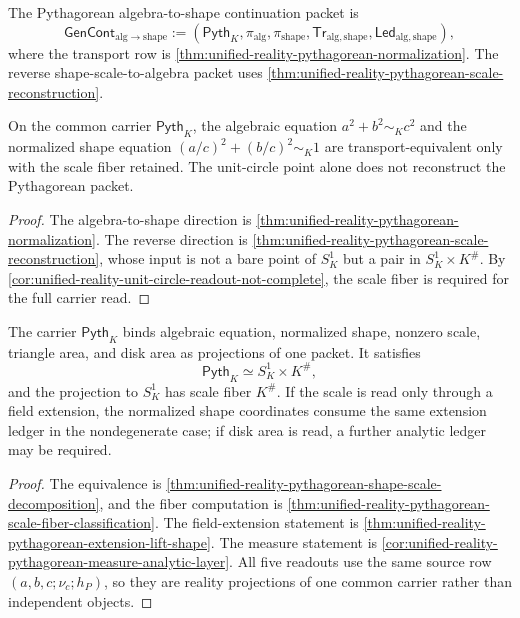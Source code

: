 \begin{definition}
\label{def:unified-reality-pythagorean-generalized-continuation}
The Pythagorean algebra-to-shape continuation packet is
$$
\mathsf{GenCont}_{\mathrm{alg}\to\mathrm{shape}}
:=
(\mathsf{Pyth}_K,\pi_{\mathrm{alg}},\pi_{\mathrm{shape}},
\mathsf{Tr}_{\mathrm{alg},\mathrm{shape}},
\mathsf{Led}_{\mathrm{alg},\mathrm{shape}}),
$$
where the transport row is
\autoref{thm:unified-reality-pythagorean-normalization}. The reverse
shape-scale-to-algebra packet uses
\autoref{thm:unified-reality-pythagorean-scale-reconstruction}.
\end{definition}

\begin{theorem}
\label{thm:unified-reality-pythagorean-algebra-geometry-transport}
On the common carrier $\mathsf{Pyth}_K$, the algebraic equation
$a^2+b^2\sim_Kc^2$ and the normalized shape equation
$(a/c)^2+(b/c)^2\sim_K1$ are transport-equivalent only with the scale
fiber retained. The unit-circle point alone does not reconstruct the
Pythagorean packet.
\end{theorem}

\begin{proof}
The algebra-to-shape direction is
\autoref{thm:unified-reality-pythagorean-normalization}. The reverse
direction is
\autoref{thm:unified-reality-pythagorean-scale-reconstruction}, whose
input is not a bare point of $S^1_K$ but a pair in $S^1_K\times K^\#$.
By \autoref{cor:unified-reality-unit-circle-readout-not-complete}, the
scale fiber is required for the full carrier read.
\end{proof}

\begin{theorem}
\label{thm:unified-reality-pythagorean-common-carrier-principle}
The carrier $\mathsf{Pyth}_K$ binds algebraic equation, normalized
shape, nonzero scale, triangle area, and disk area as projections of one
packet. It satisfies
$$
\mathsf{Pyth}_K\simeq S^1_K\times K^\#,
$$
and the projection to $S^1_K$ has scale fiber $K^\#$. If the scale is
read only through a field extension, the normalized shape coordinates
consume the same extension ledger in the nondegenerate case; if disk
area is read, a further analytic ledger may be required.
\end{theorem}

\begin{proof}
The equivalence is
\autoref{thm:unified-reality-pythagorean-shape-scale-decomposition}, and
the fiber computation is
\autoref{thm:unified-reality-pythagorean-scale-fiber-classification}.
The field-extension statement is
\autoref{thm:unified-reality-pythagorean-extension-lift-shape}. The
measure statement is
\autoref{cor:unified-reality-pythagorean-measure-analytic-layer}. All
five readouts use the same source row
$(a,b,c;\nu_c;h_P)$, so they are reality projections of one common
carrier rather than independent objects.
\end{proof}
